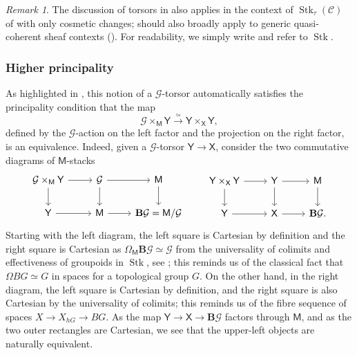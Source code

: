 \documentclass[11pt, a4paper]{article}
\newcommand{\1}{\mathbf{1}}
\newcommand{\BG}{\mathbf{B}\mathcal{G}}
\DeclareMathOperator{\Stk}{Stk}
\newcommand{\calC}{\mathcal{C}}
\newcommand{\calG}{\mathcal{G}}
\newcommand{\M}{\mathsf{M}}
\newcommand{\X}{\mathsf{X}}
\newcommand{\Y}{\mathsf{Y}}
\theoremstyle{plain}
\theoremstyle{definition}
\theoremstyle{remark}\numberwithin{equation}{section}
\newtheorem{remark}[equation]{Remark}
\begin{document}
\begin{remark}
    The discussion of torsors in  also applies in the context of $\Stk_\tau(\calC)$ of \cite[Def.2.1.1.5]{reconstruction} with only cosmetic changes;  should also broadly apply to generic quasi-coherent sheaf contexts (\cite[Df.2.1.3.2]{reconstruction}). For readability, we simply write and refer to $\Stk$.
\end{remark}

\subsubsection{Higher principality}\label{sssec:highprin}
As highlighted in \cite[]{nikolaus_schreiber_stevenson_general_theory}, this notion of a $\calG$-torsor automatically satisfies the principality condition that the map
\[\calG \times_\M \Y \xrightarrow{\simeq} \Y \times_\X \Y,\]
defined by the $\calG$-action on the left factor and the projection on the right factor, is an equivalence. Indeed, given a $\calG$-torsor $\Y \to \X$, consider the two commutative diagrams of $\M$-stacks
\[\begin{tikzcd}
    {\calG \times_\M \Y}\ar[r]\ar[d]    &   {\calG}\ar[r]\ar[d] &   {\M}\ar[d]  \\
    {\Y}\ar[r]                          &   {\M}\ar[r]          &   {\BG = \M / \calG}
\end{tikzcd}\qquad
\begin{tikzcd}
    {\Y \times_\X \Y}\ar[r]\ar[d]   &   {\Y}\ar[d]\ar[r]    &   {\M}\ar[d]  \\
    {\Y}\ar[r]                      &   {\X}\ar[r]          &   {\BG.}
\end{tikzcd}
\]
Starting with the left diagram, the left square is Cartesian by definition and the right square is Cartesian as $\Omega_\M \BG \simeq \calG$ from the universality of colimits and effectiveness of groupoids in $\Stk$, see \cite[Pr.2.1.2.9(2)]{reconstruction}; this reminds us of the classical fact that $\Omega BG \simeq G$ in spaces for a topological group $G$. On the other hand, in the right diagram, the left square is Cartesian by definition, and the right square is also Cartesian by the universality of colimits; this reminds us of the fibre sequence of spaces $X \to X_{hG} \to BG$. As the map $\Y \to \X \to \BG$ factors through $\M$, and as the two outer rectangles are Cartesian, we see that the upper-left objects are naturally equivalent.
\end{document}
